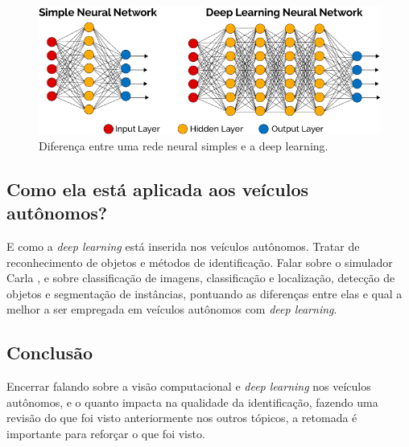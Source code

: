 \documentclass[12pt,a4paper]{article}
\begin{document}
    \begin{figure}[H]
        \centering
        \includegraphics[scale=0.5]{dp_works.png}
        \caption{Diferença entre uma rede neural simples e a deep learning.}
        \label{fig:dp_works}
    \end{figure}
    


    \subsection{Como ela está aplicada aos veículos autônomos?}
    \par E como a \emph{deep learning} está inserida nos veículos autônomos. Tratar de reconhecimento de objetos e métodos de identificação. Falar sobre o simulador Carla \cite{5} , e sobre classificação de imagens, classificação e localização, detecção de objetos e segmentação de instâncias, pontuando as diferenças entre elas e qual a melhor a ser empregada em veículos autônomos com \emph{deep learning}.



    \subsection{Conclusão}
    \par Encerrar falando sobre a visão computacional e \emph{deep learning} nos veículos autônomos, e o quanto impacta na qualidade da identificação, fazendo uma revisão do que foi visto anteriormente nos outros tópicos, a retomada é importante para reforçar o que foi visto.
\end{document}
